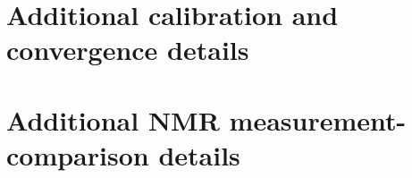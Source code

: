 \appendix

\section{Additional calibration and convergence details}
\label{app:calibration_details}

\section{Additional NMR measurement-comparison details}
\label{app:nmr_measurement_details}
